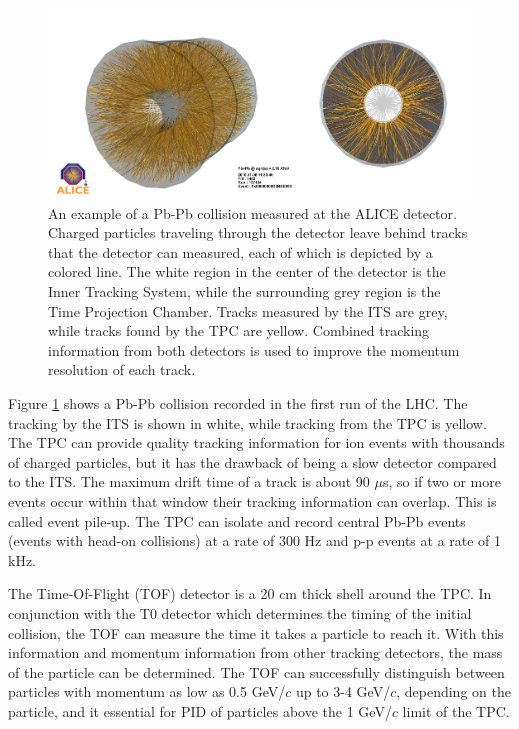 \begin{figure}[hbt]
\includegraphics[width=36pc]{Figures/BorrowedFigures/ExampleCollision.png}
\caption[Example of a Pb-Pb collision]{An example of a Pb-Pb collision measured at the ALICE detector.
Charged particles traveling through the detector leave behind tracks that the detector can measured, each of which is depicted by a colored line.
The white region in the center of the detector is the Inner Tracking System, while the surrounding grey region is the Time Projection Chamber.
Tracks measured by the ITS are grey, while tracks found by the TPC are yellow.
Combined tracking information from both detectors is used to improve the momentum resolution of each track.
}
\label{fig:ExampleCollision}
\end{figure}
Figure \ref{fig:ExampleCollision} shows a Pb-Pb collision recorded in the first run of the LHC.
The tracking by the ITS is shown in white, while tracking from the TPC is yellow.
The TPC can provide quality tracking information for ion events with thousands of charged particles, but it has the drawback of being a slow detector compared to the ITS.
The maximum drift time of a track is about 90 $\mu$s, so if two or more events occur within that window their tracking information can overlap.
This is called event pile-up.
The TPC can isolate and record central Pb-Pb events (events with head-on collisions) at a rate of 300 Hz and p-p events at a rate of 1 kHz.

The Time-Of-Flight (TOF) detector is a 20 cm thick shell around the TPC.
In conjunction with the T0 detector which determines the timing of the initial collision, the TOF can measure the time it takes a particle to reach it.
With this information and momentum information from other tracking detectors, the mass of the particle can be determined.
The TOF can successfully distinguish between particles with momentum as low as 0.5 GeV/$c$ up to 3-4 GeV/$c$, depending on the particle, and it essential for PID of particles above the 1 GeV/$c$ limit of the TPC. 

